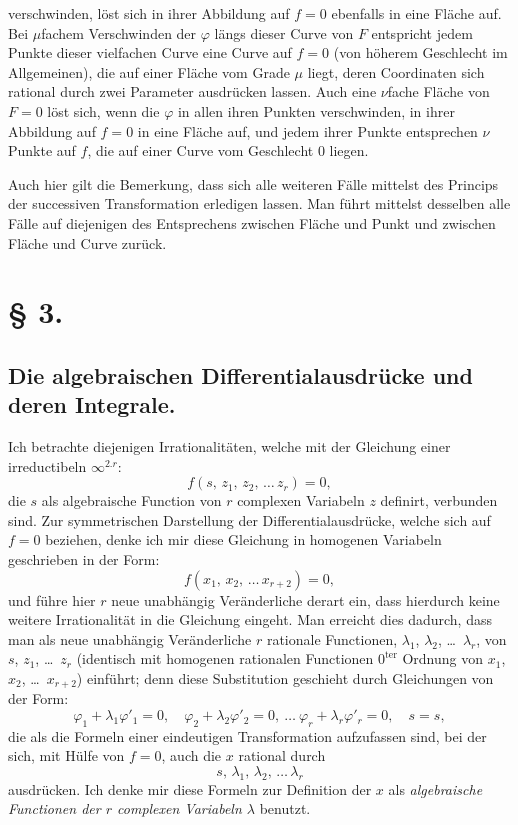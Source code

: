 \documentclass{article}
\begin{document}
verschwinden, löst sich in ihrer Abbildung auf $f = 0$ ebenfalls in eine Fläche auf. Bei $\mu$fachem Verschwinden der $\varphi$ längs dieser Curve von $F$ entspricht jedem Punkte dieser vielfachen Curve eine Curve auf $f = 0$ (von höherem Geschlecht im Allgemeinen), die auf einer Fläche vom Grade $\mu$ liegt, deren Coordinaten sich rational durch zwei Parameter ausdrücken lassen. Auch eine $\nu$fache Fläche von $F = 0$ löst sich, wenn die $\varphi$ in allen ihren Punkten verschwinden, in ihrer Abbildung auf $f = 0$ in eine Fläche auf, und jedem ihrer Punkte entsprechen $\nu$ Punkte auf $f$, die auf einer Curve vom Geschlecht $0$ liegen.

Auch hier gilt die Bemerkung, dass sich alle weiteren Fälle mittelst des Princips der successiven Transformation erledigen lassen. Man führt mittelst desselben alle Fälle auf diejenigen des Entsprechens zwischen Fläche und Punkt und zwischen Fläche und Curve zurück.

\section*{§ 3.}

\subsection*{Die algebraischen Differentialausdrücke und deren Integrale.}

Ich betrachte diejenigen Irrationalitäten, welche mit der Gleichung einer irreductibeln $\infty^{2.r}$:
\[
f(s,\, z_1,\, z_2,\, \dots\, z_r) = 0,
\]
die $s$ als algebraische Function von $r$ complexen Variabeln $z$ definirt, verbunden sind. Zur symmetrischen Darstellung der Differentialausdrücke, welche sich auf $f = 0$ beziehen, denke ich mir diese Gleichung in homogenen Variabeln geschrieben in der Form:
\[
f(x_1,\, x_2,\, \dots\, x_{r+2}) = 0, \tag{1}
\]
und führe hier $r$ neue unabhängig Veränderliche derart ein, dass hierdurch keine weitere Irrationalität in die Gleichung eingeht. Man erreicht dies dadurch, dass man als neue unabhängig Veränderliche $r$ rationale Functionen, $\lambda_1$, $\lambda_2$, \dots\ $\lambda_r$, von $s$, $z_1$, \dots\ $z_r$ (identisch mit homogenen rationalen Functionen $0^{\text{ter}}$ Ordnung von $x_1$, $x_2$, \dots\ $x_{r+2}$) einführt; denn diese Substitution geschieht durch Gleichungen von der Form:
\[
\varphi_1 + \lambda_1 \varphi'_1 = 0, \quad \varphi_2 + \lambda_2 \varphi'_2 = 0, \ \dots\ \varphi_r + \lambda_r \varphi'_r = 0, \quad s = s,
\]
die als die Formeln einer eindeutigen Transformation aufzufassen sind, bei der sich, mit Hülfe von $f = 0$, auch die $x$ rational durch
\[
s,\, \lambda_1,\, \lambda_2,\, \dots\, \lambda_r
\]
ausdrücken. Ich denke mir diese Formeln zur Definition der $x$ als \emph{algebraische Functionen der $r$ complexen Variabeln $\lambda$} benutzt.
\end{document}
